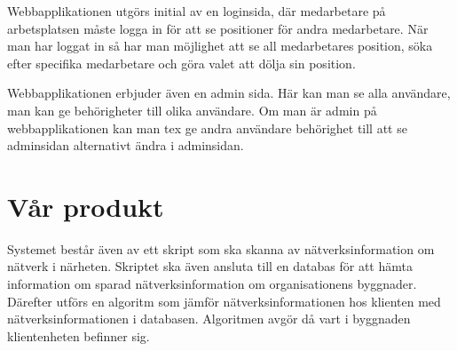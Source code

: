\documentclass[swedish, a4paper,12pt]{article}
\begin{document}
Webbapplikationen utgörs initial av en loginsida, där medarbetare på arbetsplatsen måste logga in för att se positioner för andra medarbetare. När man har loggat in så har man möjlighet att se all medarbetares position, söka efter specifika medarbetare och göra valet att dölja sin position.

Webbapplikationen erbjuder även en admin sida. Här kan man se alla användare, man kan ge behörigheter till olika användare. Om man är admin på webbapplikationen kan man tex ge andra användare behörighet till att se adminsidan alternativt ändra i adminsidan.


\section{Vår produkt}

\iffalse
\section{DEL x}\label{sec:delX}

\section{DEL x+1}
\section{DEL x+2}

\fi
Systemet består även av ett skript som ska skanna av nätverksinformation om nätverk i närheten. Skriptet ska även ansluta till en databas för att hämta information om sparad nätverksinformation om organisationens byggnader. Därefter utförs en algoritm som jämför nätverksinformationen hos klienten med nätverksinformationen i databasen. Algoritmen avgör då vart i byggnaden klientenheten befinner sig.
\end{document}
